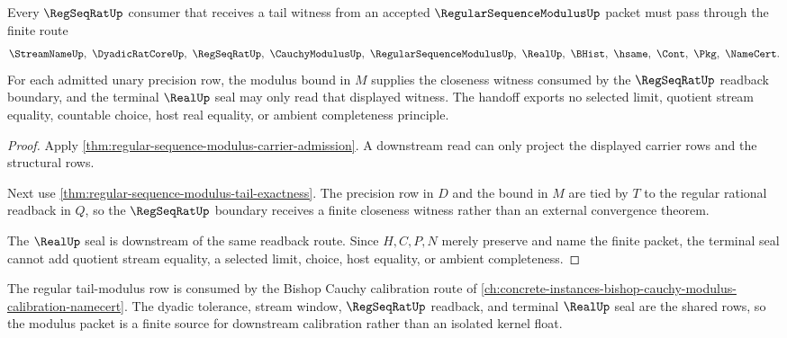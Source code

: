 \begin{theorem}
\label{thm:regular-sequence-modulus-regseqrat-handoff}
Every $\RegSeqRatUp$ consumer that receives a tail witness from an accepted $\RegularSequenceModulusUp$ packet must pass through the finite route
$$
\StreamNameUp,\ \DyadicRatCoreUp,\ \RegSeqRatUp,\ \CauchyModulusUp,\ \RegularSequenceModulusUp,\ \RealUp,\ \BHist,\ \hsame,\ \Cont,\ \Pkg,\ \NameCert .
$$
For each admitted unary precision row, the modulus bound in $M$ supplies the closeness witness consumed by the $\RegSeqRatUp$ readback boundary, and the terminal $\RealUp$ seal may only read that displayed witness. The handoff exports no selected limit, quotient stream equality, countable choice, host real equality, or ambient completeness principle.
\end{theorem}
\begin{proof}
Apply \autoref{thm:regular-sequence-modulus-carrier-admission}. A downstream read can only project the displayed carrier rows and the structural rows.

Next use \autoref{thm:regular-sequence-modulus-tail-exactness}. The precision row in $D$ and the bound in $M$ are tied by $T$ to the regular rational readback in $Q$, so the $\RegSeqRatUp$ boundary receives a finite closeness witness rather than an external convergence theorem.

The $\RealUp$ seal is downstream of the same readback route. Since $H,C,P,N$ merely preserve and name the finite packet, the terminal seal cannot add quotient stream equality, a selected limit, choice, host equality, or ambient completeness.
\end{proof}

The regular tail-modulus row is consumed by the Bishop Cauchy calibration route of \autoref{ch:concrete-instances-bishop-cauchy-modulus-calibration-namecert}. The dyadic tolerance, stream window, $\RegSeqRatUp$ readback, and terminal $\RealUp$ seal are the shared rows, so the modulus packet is a finite source for downstream calibration rather than an isolated kernel float.



